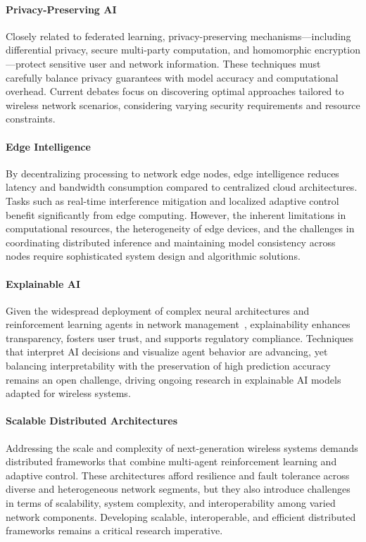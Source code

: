\documentclass[sigconf]{acmart}
\begin{document}
\paragraph{Privacy-Preserving AI} Closely related to federated learning, privacy-preserving mechanisms—including differential privacy, secure multi-party computation, and homomorphic encryption—protect sensitive user and network information. These techniques must carefully balance privacy guarantees with model accuracy and computational overhead. Current debates focus on discovering optimal approaches tailored to wireless network scenarios, considering varying security requirements and resource constraints.

\paragraph{Edge Intelligence} By decentralizing processing to network edge nodes, edge intelligence reduces latency and bandwidth consumption compared to centralized cloud architectures. Tasks such as real-time interference mitigation and localized adaptive control benefit significantly from edge computing. However, the inherent limitations in computational resources, the heterogeneity of edge devices, and the challenges in coordinating distributed inference and maintaining model consistency across nodes require sophisticated system design and algorithmic solutions.

\paragraph{Explainable AI} Given the widespread deployment of complex neural architectures and reinforcement learning agents in network management~\cite{ref50}, explainability enhances transparency, fosters user trust, and supports regulatory compliance. Techniques that interpret AI decisions and visualize agent behavior are advancing, yet balancing interpretability with the preservation of high prediction accuracy remains an open challenge, driving ongoing research in explainable AI models adapted for wireless systems.

\paragraph{Scalable Distributed Architectures} Addressing the scale and complexity of next-generation wireless systems demands distributed frameworks that combine multi-agent reinforcement learning and adaptive control. These architectures afford resilience and fault tolerance across diverse and heterogeneous network segments, but they also introduce challenges in terms of scalability, system complexity, and interoperability among varied network components. Developing scalable, interoperable, and efficient distributed frameworks remains a critical research imperative.
\end{document}

